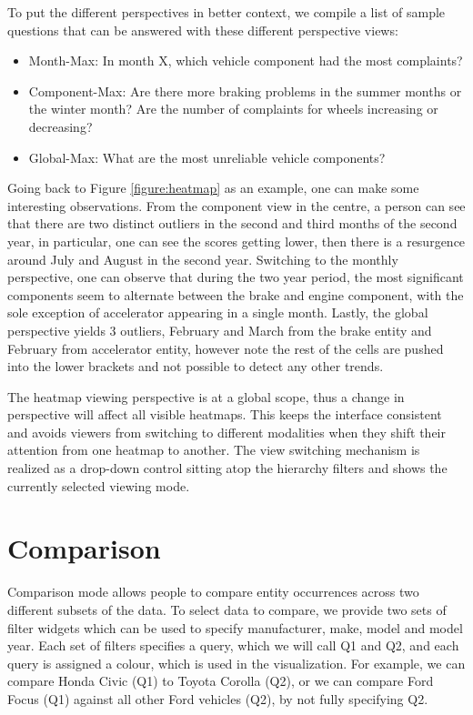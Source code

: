 To put the different perspectives in better context, we compile a list of sample 
questions that can be answered with these different perspective views:
\begin{itemize} [noitemsep]
  \item Month-Max: In month X, which vehicle component had the most complaints?
  \item Component-Max: Are there more braking problems in the summer months or
  the winter month? Are the number of complaints for wheels increasing or
  decreasing?
  \item Global-Max: What are the most unreliable vehicle components?
\end{itemize}

Going back to Figure \ref{figure:heatmap} as an example, one can make some
interesting observations. From the component view in the centre, a person can
see that there are two distinct outliers in the second and third months of the
second year, in particular, one can see the scores getting lower, then there is
a resurgence around July and August in the second year. Switching to the monthly
perspective, one can observe that during the two year period, the most
significant components seem to alternate between the brake and engine component,
with the sole exception of accelerator appearing in a single month. Lastly, the
global perspective yields 3 outliers, February and March from the brake entity
and February from accelerator entity, however note the rest of the cells are
pushed into the lower brackets and not possible to detect any other trends.
 
The heatmap viewing perspective is at a global scope, thus a change in
perspective will affect all visible heatmaps. This keeps the interface
consistent and avoids viewers from switching to different modalities when they
shift their attention from one heatmap to another. The view switching mechanism
is realized as a drop-down control sitting atop the hierarchy filters and shows
the currently selected viewing mode.



\section{Comparison}
Comparison mode allows people to compare entity occurrences across
two different subsets of the data. To select data to compare, we provide
two sets of filter widgets which can be used to specify manufacturer,
make, model and model year. Each set of filters specifies a query,
which we will call Q1 and Q2, and each query is assigned a colour,
which is used in the visualization. For example, we can compare
Honda Civic (Q1) to Toyota Corolla (Q2), or we can compare Ford
Focus (Q1) against all other Ford vehicles (Q2), by not fully specifying Q2.

